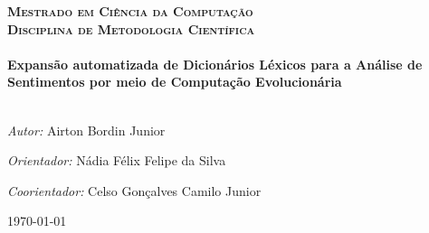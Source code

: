 \documentclass[a4paper,11pt]{article}
\begin{document}
\begin{titlepage}
\begin{center}
\begin{figure}
\begin{minipage}{.5\textwidth}
\end{minipage}
\end{figure}



\textsc{\large \textbf{Mestrado em Ciência da Computação}}\\[0.5cm]
\textsc{\large \textbf{Disciplina de Metodologia Científica}}\\[1.5cm] %


\HRule \\[0.4cm]
{ \huge \bfseries Expansão automatizada de Dicionários Léxicos para a Análise de Sentimentos por meio de Computação Evolucionária}\\[0.4cm] %
\HRule \\[1.5cm]


\begin{framed}
\emph{Autor:} Airton Bordin Junior
\par
\emph{Orientador:} Nádia Félix Felipe da Silva
\par
\emph{Coorientador:} Celso Gonçalves Camilo Junior
\end{framed}

\vspace*{3cm}


{\large \today}\\ %

\end{center}


\vfill %

\end{titlepage}
\end{document}
